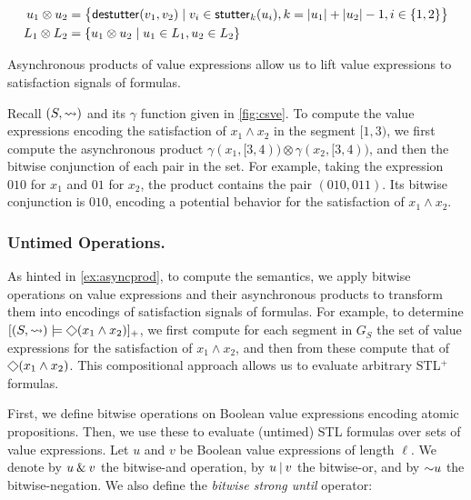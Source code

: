 \vspace{-1.25em}
\small
\begin{align*}
	u_1 \otimes u_2 &= \big\{ \destutter(v_1, v_2) \st v_i \in \stutter_k(u_i), k = |u_1| + |u_2| - 1, i \in 
	\{1,2\} \big\} \\ \vspace{-0.5em}
	L_1 \otimes L_2 &= \{ u_1 \otimes u_2 \st u_1 \in L_1, u_2 \in L_2 \}
\end{align*}
\normalsize

Asynchronous products of value expressions allow us to lift value expressions to satisfaction signals of formulas.

\begin{example} \label{ex:asyncprod}
	Recall $(S, {\rightsquigarrow})$ and its $\gamma$ function given in \cref{fig:csve}.
	To compute the value expressions encoding the satisfaction of $x_1 \land x_2$ in the segment $[1,3)$, we first compute the asynchronous product $\gamma(x_1, [3,4)) \otimes \gamma(x_2, [3,4))$, and then the bitwise conjunction of each pair in the set.
	For example, taking the expression $0  1  0$ for $x_1$ and $0  1$ for $x_2$, the product contains the pair $(010, 011)$.
	Its bitwise conjunction is $0  1  0$, encoding a potential behavior for the satisfaction of $x_1 \land x_2$.
\end{example}

\subsubsection{Untimed Operations.}
As hinted in \cref{ex:asyncprod}, to compute the semantics, we apply bitwise operations on value expressions and their asynchronous products to transform them into encodings of satisfaction signals of formulas.
For example, to determine $[(S, {\hb}) \models \LTLeventually (x_1 \land x_2)]_+$, we first compute for each segment in $G_S$ the set of value expressions for the satisfaction of $x_1 \land x_2$, and then from these compute that of $\LTLeventually (x_1 \land x_2)$.
This compositional approach allows us to evaluate arbitrary STL$^+$ formulas.

First, we define bitwise operations on Boolean value expressions encoding atomic propositions.
Then, we use these to evaluate (untimed) STL formulas over sets of value expressions.
%
Let $u$ and $v$ be Boolean value expressions of length $\ell$.
We denote by $u \mathbin{\&} v$ the bitwise-and operation, by $u \mathbin{|} v$ the bitwise-or, and by $\mathord{\sim} u$ the bitwise-negation.
We also define the \emph{bitwise strong until} operator:

